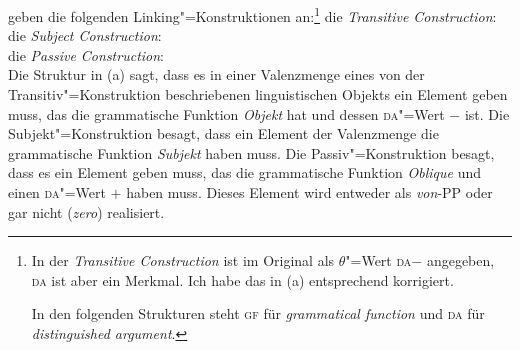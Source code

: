 %
\citet[--57]{MR2001a} geben die folgenden Linking"=Konstruktionen an:\footnote{
  In der \emph{Transitive Construction} ist im Original als $\theta$"=Wert \textsc{da}$-$
  angegeben, \textsc{da} ist aber ein Merkmal. Ich habe das in (a) entsprechend korrigiert.

  In den folgenden Strukturen steht \textsc{gf} für \emph{grammatical function} und \textsc{da} für \emph{distinguished argument}.%
}
\eal
\label{linking-konstruktionen}
\ex\label{transitiv-Konstruktion} die \emph{Transitive Construction}:\\
\ex die \emph{Subject Construction}:\\
\ex die \emph{Passive Construction}:\\
\zl
Die Struktur in (a) sagt, dass es in einer Valenzmenge eines von
der Transitiv"=Konstruktion beschriebenen linguistischen Objekts ein Element geben muss, das die grammatische Funktion
\emph{Objekt} hat und dessen \textsc{da}"=Wert $-$ ist. Die Subjekt"=Konstruktion besagt, dass ein
Element der Valenzmenge die grammatische Funktion \emph{Subjekt} haben muss. Die Passiv"=Konstruktion
besagt, dass es ein Element geben muss, das die grammatische Funktion \emph{Oblique} und einen
\textsc{da}"=Wert $+$ haben muss. Dieses Element wird entweder als \emph{von}-PP oder gar nicht (\emph{zero})
realisiert.

